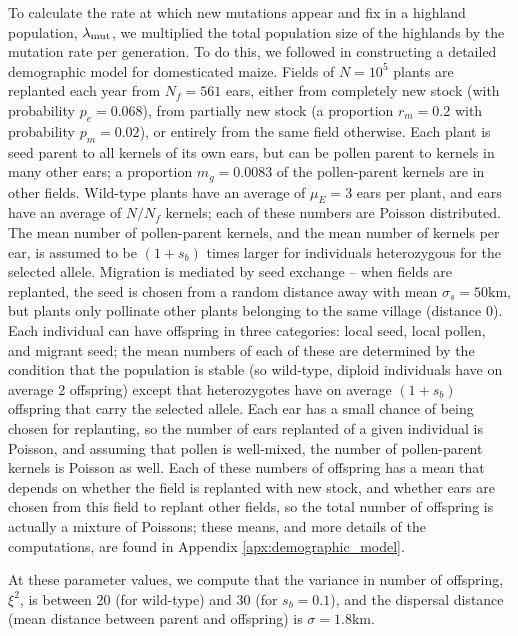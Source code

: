 To calculate the rate at which new mutations appear and fix in a highland population, $\lambda_{\text{mut}}$,
we multiplied the total population size of the highlands by the mutation rate per generation.
To do this,
we followed \citet{vanHeerwaarden2010} in constructing a detailed demographic model for domesticated maize.
Fields of $N=10^5$ plants are replanted each year from $N_f=561$ ears,
either from completely new stock (with probability $p_e=0.068$),
from partially new stock (a proportion $r_m=0.2$ with probability $p_m=0.02$),
or entirely from the same field otherwise.
Each plant is seed parent to all kernels of its own ears, but can be pollen parent to kernels in many other ears;
a proportion $m_g=0.0083$ of the pollen-parent kernels are in other fields.
Wild-type plants have an average of $\mu_E=3$ ears per plant, and ears have an average of $N/N_f$ kernels;
each of these numbers are Poisson distributed.
The mean number of pollen-parent kernels, and the mean number of kernels per ear, 
is assumed to be $(1+s_b)$ times larger for individuals heterozygous for the selected allele.
Migration is mediated by seed exchange --
when fields are replanted, the seed is chosen from a random distance away with mean $\sigma_s=50$km,
but plants only pollinate other plants belonging to the same village (distance 0).
Each individual can have offspring in three categories: local seed, local pollen, and migrant seed;
the mean numbers of each of these are determined by the condition that the population is stable
(so wild-type, diploid individuals have on average 2 offspring)
except that heterozygotes have on average $(1+s_b)$ offspring that carry the selected allele.
Each ear has a small chance of being chosen for replanting,
so the number of ears replanted of a given individual is Poisson,
and assuming that pollen is well-mixed, the number of pollen-parent kernels is Poisson as well.
Each of these numbers of offspring has a mean that depends on whether the field is replanted with new stock,
and whether ears are chosen from this field to replant other fields,
so the total number of offspring is actually a mixture of Poissons;
these means, and more details of the computations, are found in Appendix \ref{apx:demographic_model}.


At these parameter values, we compute that the variance in number of offspring, $\xi^2$, is between 20 (for wild-type) and 30 (for $s_b=0.1$), 
and the dispersal distance (mean distance between parent and offspring)
is $\sigma=1.8$km.

